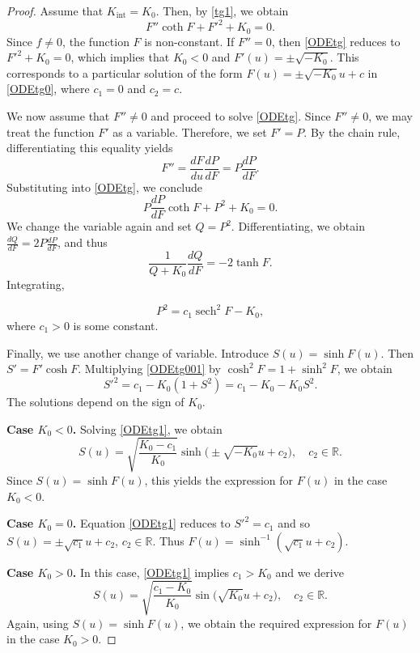 \documentclass[12pt,reqno]{amsart}
\def\r{\mathbb R}
\DeclareMathOperator{\sech}{sech}
\theoremstyle{definition}
\begin{document}
\begin{proof}
Assume that $K_{\mathrm{int}}=K_0$. Then, by \eqref{tg1}, we obtain
\begin{equation}\label{ODEtg}
F''\coth F+F'^2+K_0=0.
\end{equation}
Since $f\neq 0$, the function $F$ is non-constant. If $F''=0$, then \eqref{ODEtg} reduces to $F'^2+K_0=0$, which implies that $K_0<0$ and $F'(u)=\pm\sqrt{-K_0}$. This corresponds to a particular solution of the form $F(u)=\pm\sqrt{-K_0}u+c$ in \eqref{ODEtg0}, where $c_1=0$ and $c_2=c$.

We now assume that $F''\neq 0$ and proceed to solve \eqref{ODEtg}. Since $F''\neq 0$, we may treat the function $F'$ as a variable. Therefore, we set $F'=P$. By the chain rule, differentiating this equality yields
$$F''=\frac{dF}{du}\frac{dP}{dF}=P\frac{dP}{dF}.$$ 
Substituting into \eqref{ODEtg}, we conclude
$$
P\frac{dP}{dF}\coth F+P^2+K_0=0.
$$
We change the variable again and set $Q=P^2$. Differentiating, we obtain $\frac{dQ}{dF}=2P\frac{dP}{dF}$, and thus
$$
\frac{1}{Q+K_0}\frac{dQ}{dF}=-2\tanh F.
$$
Integrating,

\begin{equation}\label{ODEtg001}
P^2=c_1\sech^2F-K_0,
\end{equation}
where $c_1>0$ is some constant.

Finally, we use another change of variable. Introduce $S(u)=\sinh F(u)$. Then $S'=F'\cosh F$. Multiplying \eqref{ODEtg001} by $\cosh^2 F=1+\sinh^2 F$, we obtain
\begin{equation}\label{ODEtg1}
S'^2=c_1-K_0(1+S^2)=c_1-K_0-K_0S^2.
\end{equation}
The solutions depend on the sign of $K_0$.

\textbf{Case $K_0<0$.} Solving \eqref{ODEtg1}, we obtain
$$
S(u)=\sqrt{\frac{K_0-c_1}{K_0}}\sinh \big (\pm\sqrt{-K_0}u+c_2 \big ), \quad c_2\in \r.
$$
Since $S(u)=\sinh F(u)$, this yields the expression for $F(u)$ in the case $K_0<0$.

\textbf{Case $K_0=0$.} Equation \eqref{ODEtg1} reduces to $S'^2=c_1$ and so $S(u)=\pm \sqrt{c_1}u+c_2$, $c_2\in \r.$ Thus $F(u)=\sinh^{-1}(\sqrt{c_1}u+c_2)$. 

\textbf{Case $K_0>0$.} In this case, \eqref{ODEtg1} implies $c_1>K_0$ and we derive
$$
S(u)=\sqrt{\frac{c_1-K_0}{K_0}}\sin \big (\sqrt{K_0}u+c_2 \big ), \quad c_2\in \r.
$$
Again, using $S(u)=\sinh F(u)$, we obtain the required expression for $F(u)$ in the case $K_0>0$.
\end{proof}
\end{document}
